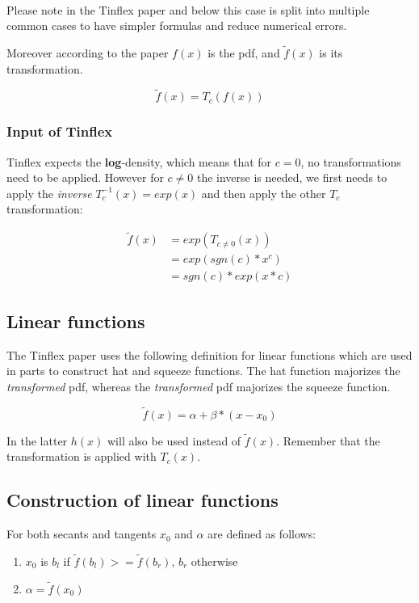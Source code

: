 \documentclass[]{article}
\begin{document}
\ \\

Please note in the Tinflex paper and below this case is split into multiple common cases to have simpler formulas and reduce numerical errors.

Moreover according to the paper $f(x)$ is the pdf, and $\tilde{f}(x)$ is its transformation.

\[\tilde{f}(x) = T_c(f(x))  \]

\subsubsection{Input of Tinflex}

Tinflex expects the \textbf{log}-density, which means that for $c = 0$, no transformations need to be applied.
However for $c \neq 0$ the inverse is needed, we first needs to apply the \textit{inverse} $T_c^{-1}(x) = exp(x)$ and then apply the other $T_c$ transformation:

\begin{align*}
\tilde{f}(x) &= exp(T_{c \neq 0}(x)) \\
&= exp(sgn(c) * x^c) \\
&= sgn(c) * exp(x * c)
\end{align*}

\subsection{Linear functions}

The Tinflex paper uses the following definition for linear functions which are used in parts to construct hat and squeeze functions. The hat function majorizes the \textit{transformed} pdf, whereas the \textit{transformed} pdf majorizes the squeeze function.

\[ \tilde{f}(x) = \alpha + \beta * (x - x_0) \]

In the latter $h(x)$ will also be used instead of $\tilde{f}(x)$.
Remember that the transformation is applied with $T_c(x)$.

\subsection{Construction of linear functions}

For both secants and tangents $x_0$ and $\alpha$ are defined as follows:

\begin{enumerate}
\item $x_0$ is $b_l$ if $\tilde{f}(b_l) >= \tilde{f}(b_r)$, $b_r$ otherwise
\item $\alpha = \tilde{f}(x_0)$
\end{enumerate}
\end{document}
